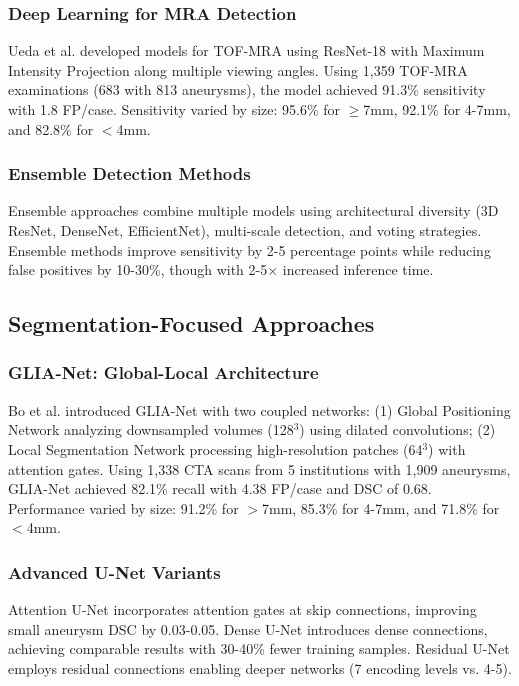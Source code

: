 \documentclass[conference]{IEEEtran}
\begin{document}
\subsubsection{Deep Learning for MRA Detection}
Ueda et al. \cite{ueda2019deep} developed models for TOF-MRA using ResNet-18 with Maximum Intensity Projection along multiple viewing angles. Using 1,359 TOF-MRA examinations (683 with 813 aneurysms), the model achieved 91.3\% sensitivity with 1.8 FP/case. Sensitivity varied by size: 95.6\% for $\geq$7mm, 92.1\% for 4-7mm, and 82.8\% for $<$4mm.

\subsubsection{Ensemble Detection Methods}
Ensemble approaches combine multiple models using architectural diversity (3D ResNet, DenseNet, EfficientNet), multi-scale detection, and voting strategies. Ensemble methods improve sensitivity by 2-5 percentage points while reducing false positives by 10-30\%, though with 2-5$\times$ increased inference time.

\subsection{Segmentation-Focused Approaches}

\subsubsection{GLIA-Net: Global-Local Architecture}
Bo et al. \cite{bo2021toward} introduced GLIA-Net with two coupled networks: (1) Global Positioning Network analyzing downsampled volumes (128$^3$) using dilated convolutions; (2) Local Segmentation Network processing high-resolution patches (64$^3$) with attention gates. Using 1,338 CTA scans from 5 institutions with 1,909 aneurysms, GLIA-Net achieved 82.1\% recall with 4.38 FP/case and DSC of 0.68. Performance varied by size: 91.2\% for $>$7mm, 85.3\% for 4-7mm, and 71.8\% for $<$4mm.

\subsubsection{Advanced U-Net Variants}
Attention U-Net \cite{oktay2018attention} incorporates attention gates at skip connections, improving small aneurysm DSC by 0.03-0.05. Dense U-Net introduces dense connections, achieving comparable results with 30-40\% fewer training samples. Residual U-Net employs residual connections enabling deeper networks (7 encoding levels vs. 4-5).
\end{document}
